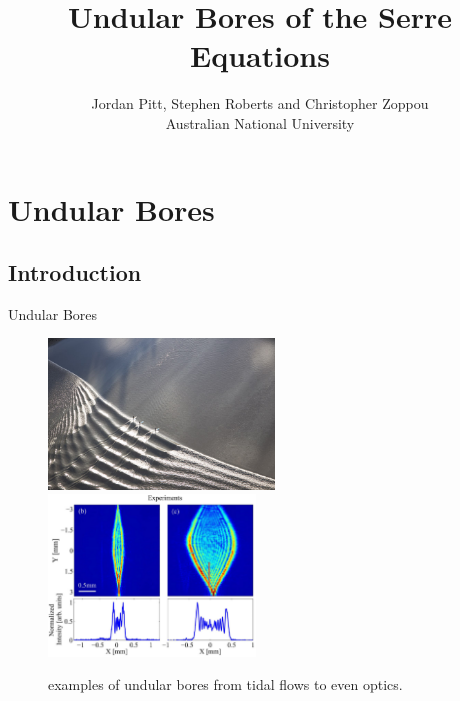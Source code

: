 \documentclass[pdf]{beamer}
\title{Undular Bores of the Serre Equations}
\author{Jordan Pitt, Stephen Roberts and Christopher Zoppou \\ Australian National University}
\begin{document}
\begin{frame}
\titlepage
\end{frame}
\section{Undular Bores}
\subsection{Introduction}
\begin{frame}{Undular Bores}
	
	
	
	\begin{figure}
		\includegraphics[width=6cm]{../Pics/Web/tidal.jpg}
		\includegraphics[width=5.5cm]{../Pics/Web/U1.png}
		\caption{examples of undular bores from tidal flows to even optics.}
		\label{fig:RLpics}
	\end{figure}
	
\end{frame}
\end{document}
